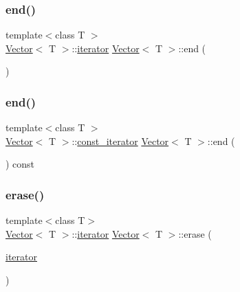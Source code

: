 \mbox{\label{classVector_ac03563dbb2d417a36096b524a4875674_ac03563dbb2d417a36096b524a4875674}} 
\subsubsection{\texorpdfstring{end()}{end()}\hspace{0.1cm}{\footnotesize\ttfamily [1/2]}}
{\footnotesize\ttfamily template$<$class T $>$ \\
\hyperlink{classVector}{Vector}$<$ T $>$\+::\hyperlink{classVector_1_1iterator}{iterator} \hyperlink{classVector}{Vector}$<$ T $>$\+::end (\begin{DoxyParamCaption}{ }\end{DoxyParamCaption})}

\mbox{\label{classVector_acb239aab833edfd7bb5ccd21c02ab505_acb239aab833edfd7bb5ccd21c02ab505}} 
\subsubsection{\texorpdfstring{end()}{end()}\hspace{0.1cm}{\footnotesize\ttfamily [2/2]}}
{\footnotesize\ttfamily template$<$class T $>$ \\
\hyperlink{classVector}{Vector}$<$ T $>$\+::\hyperlink{classVector_1_1const__iterator}{const\+\_\+iterator} \hyperlink{classVector}{Vector}$<$ T $>$\+::end (\begin{DoxyParamCaption}{ }\end{DoxyParamCaption}) const}

\mbox{\label{classVector_a423c0d0a3a93438489f596333e43990b_a423c0d0a3a93438489f596333e43990b}} 
\subsubsection{\texorpdfstring{erase()}{erase()}}
{\footnotesize\ttfamily template$<$class T$>$ \\
\hyperlink{classVector}{Vector}$<$ T $>$\+::\hyperlink{classVector_1_1iterator}{iterator} \hyperlink{classVector}{Vector}$<$ T $>$\+::erase (\begin{DoxyParamCaption}\item[{\hyperlink{classVector_1_1iterator}{iterator}}]{ }\end{DoxyParamCaption})}

